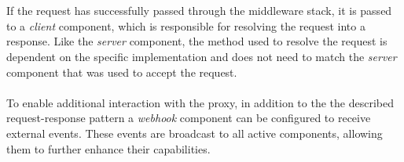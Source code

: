 \\\\
If the request has successfully passed through the middleware stack, it is passed to a \textit{client} component, which is responsible for resolving the request into a response. Like the \textit{server} component, the method used to resolve the request is dependent on the specific implementation and does not need to match the \textit{server} component that was used to accept the request.
\\\\
To enable additional interaction with the proxy, in addition to the the described request-response pattern a \textit{webhook} component can be configured to receive external events. These events are broadcast to all active components, allowing them to further enhance their capabilities.
